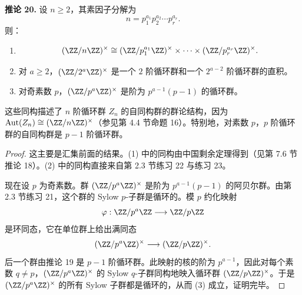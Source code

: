 \noindent\textbf{推论 20.} 设 $n\geq2$，其素因子分解为
\[
n=p_1^{a_1}p_2^{a_2}\cdots p_r^{a_r}.
\]
则：
\begin{enumerate}[label=(\arabic*)]
	\item
	\[
	(\ZZ/n\ZZ)^\times\cong
	(\ZZ/p_1^{a_1}\ZZ)^\times\times\cdots\times(\ZZ/p_r^{a_r}\ZZ)^\times.
	\]
	\item 对 $a\geq2$，$(\ZZ/2^a\ZZ)^\times$ 是一个 $2$ 阶循环群和一个 $2^{a-2}$ 阶循环群的直积。
	\item 对奇素数 $p$，$(\ZZ/p^a\ZZ)^\times$ 是阶为 $p^{a-1}(p-1)$ 的循环群。
\end{enumerate}

\begin{remark}
这些同构描述了 $n$ 阶循环群 $Z_n$ 的自同构群的群论结构，因为 $\operatorname{Aut}(Z_n)\cong(\ZZ/n\ZZ)^\times$（参见第 4.4 节命题 16）。特别地，对素数 $p$，$p$ 阶循环群的自同构群是 $p-1$ 阶循环群。
\end{remark}

\begin{proof}
	这主要是汇集前面的结果。(1) 中的同构由中国剩余定理得到（见第 7.6 节推论 18）。(2) 中的同构直接来自第 2.3 节练习 22 与练习 23。

	现在设 $p$ 为奇素数。群 $(\ZZ/p^a\ZZ)^\times$ 是阶为 $p^{a-1}(p-1)$ 的阿贝尔群。由第 2.3 节练习 21，这个群的 Sylow $p$-子群是循环的。模 $p$ 约化映射
\[
\varphi: \ZZ/p^a\ZZ\longrightarrow \ZZ/p\ZZ
\]
是环同态，它在单位群上给出满同态
\[
(\ZZ/p^a\ZZ)^\times\longrightarrow (\ZZ/p\ZZ)^\times.
\]
后一个群由推论 19 是 $p-1$ 阶循环群。此映射的核的阶为 $p^{a-1}$，因此对每个素数 $q\neq p$，$(\ZZ/p^a\ZZ)^\times$ 的 Sylow $q$-子群同构地映入循环群 $(\ZZ/p\ZZ)^\times$。于是 $(\ZZ/p^a\ZZ)^\times$ 的所有 Sylow 子群都是循环的，从而 (3) 成立，证明完毕。
\end{proof}


